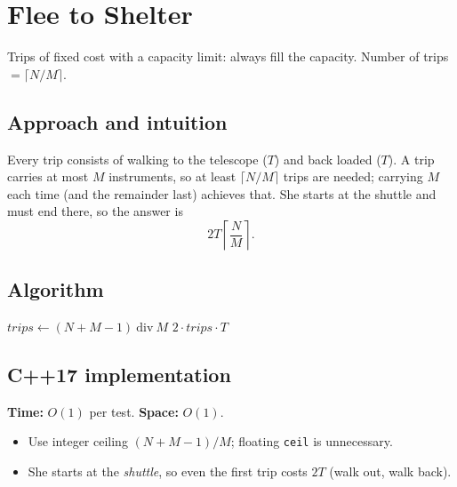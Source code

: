 \section{Flee to Shelter}
\label{sec:g-flee}


\begin{patternbox}
Trips of fixed cost with a capacity limit: always fill the capacity.
Number of trips $=\lceil N/M\rceil$.
\end{patternbox}

\subsection*{Approach and intuition}

Every trip consists of walking to the telescope ($T$) and back loaded
($T$). A trip carries at most $M$ instruments, so at least $\lceil
N/M\rceil$ trips are needed; carrying $M$ each time (and the remainder last)
achieves that. She starts at the shuttle and must end there, so the answer
is
\[
  2T\left\lceil \frac{N}{M}\right\rceil .
\]

\subsection*{Algorithm}
\begin{algorithmic}[1]
\State $trips\gets (N+M-1)\ \mathrm{div}\ M$ 
\State \Return $2\cdot trips\cdot T$
\end{algorithmic}


\subsection*{C++17 implementation}

\begin{complexitybox}
\textbf{Time:} $O(1)$ per test. \textbf{Space:} $O(1)$.
\end{complexitybox}

\begin{pitfallbox}
\begin{itemize}
  \item Use integer ceiling $(N+M-1)/M$; floating \texttt{ceil} is
        unnecessary.
  \item She starts at the \emph{shuttle}, so even the first trip costs
        $2T$ (walk out, walk back).
\end{itemize}
\end{pitfallbox}
